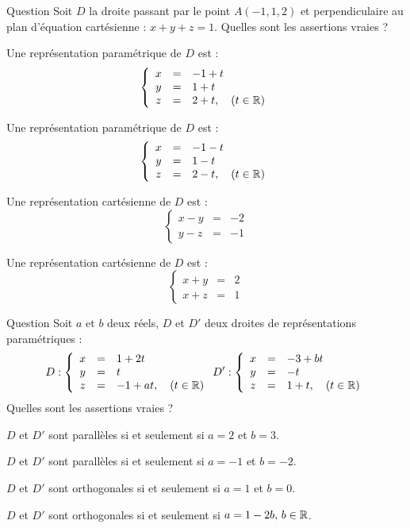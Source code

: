 \begin{multi}[multiple,feedback=
{\(D\) est dirigée par le vecteur \(\vec{u}(1,1,1)\).
}]{Question}
Soit \(D\) la droite passant par le point \(A(-1,1,2)\) et perpendiculaire au plan d'équation cartésienne : \(x+y+z=1\). Quelles sont les assertions vraies ?

    \item* Une représentation paramétrique de \(D\) est :
\[\left\{\begin{array}{ccl}x&=&-1+t\\y&=&1+t\\ z&=&2+t,\quad (t\in \mathbb{R}) \end{array}\right.\]
    \item* Une représentation paramétrique de \(D\) est :
\[\left\{\begin{array}{ccl}x&=&-1-t\\y&=&1-t\\ z&=&2-t,\quad (t\in \mathbb{R}) \end{array}\right.\]
    \item* Une représentation cartésienne de \(D\) est :
\[\left\{\begin{array}{ccl}x-y&=&-2\\y-z&=&-1 \end{array}\right.\]
    \item Une représentation cartésienne de \(D\) est :
\[\left\{\begin{array}{ccl}x+y&=&2\\x+z&=&1 \end{array}\right.\]
\end{multi}


\begin{multi}[multiple,feedback=
{Si \(D\) est dirigée par un vecteur \(\vec{u}\) et \(D'\) est dirigée par un vecteur \(\vec{v}\), \(D\) et \(D'\) sont parallèles si et seulement si \(\vec{u} \wedge \vec{v} = \overrightarrow 0\). \(D\) et \(D'\) sont othogonales si et seulement si \(\vec{u} \cdot  \vec{v}=0\).
}]{Question}
Soit \(a\) et \(b\) deux réels, \(D\) et \(D'\) deux droites de représentations paramétriques :
\[D: \left\{\begin{array}{ccl}x&=&1+2t\\y&=&t\\ z&=&-1+at,\quad (t\in \mathbb{R}) \end{array}\right. D': \left\{\begin{array}{ccl}x&=&-3+bt\\y&=&-t\\ z&=&1+t,\quad (t\in \mathbb{R}) \end{array}\right. 
\] Quelles sont les assertions vraies ?

    \item \(D\) et \(D'\) sont parallèles si et seulement si \(a=2\) et \(b=3\).
    \item* \(D\) et \(D'\) sont parallèles si et seulement si \(a=-1\) et \(b=-2\).
    \item \(D\) et \(D'\) sont orthogonales  si et seulement si \(a=1\) et \(b=0\).
    \item* \(D\) et \(D'\) sont orthogonales  si et seulement si \(a=1-2b, \, b \in \mathbb{R}\).
\end{multi}


